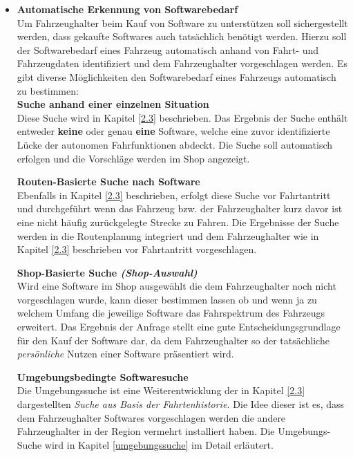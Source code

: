 \begin{itemize}
	\item[] \hspace{-0.6cm} \textbf{Automatische Erkennung von Softwarebedarf}\\
	Um Fahrzeughalter beim Kauf von Software zu unterstützen soll sichergestellt werden, dass gekaufte Softwares auch tatsächlich benötigt werden. Hierzu soll der Softwarebedarf eines Fahrzeug automatisch anhand von Fahrt- und Fahrzeugdaten identifiziert und dem Fahrzeughalter vorgeschlagen werden. Es gibt diverse Möglichkeiten den Softwarebedarf eines Fahrzeugs automatisch zu bestimmen:\\	
	\subitem \textbf{Suche anhand einer einzelnen Situation} \\
		Diese Suche wird in Kapitel \ref{2.3} beschrieben. Das Ergebnis der Suche enthält entweder \textbf{keine} oder genau \textbf{eine} Software, welche eine zuvor identifizierte Lücke der autonomen Fahrfunktionen abdeckt. Die Suche soll automatisch erfolgen und die Vorschläge werden im Shop angezeigt.
		
	\subitem \textbf{Routen-Basierte Suche nach Software}\\
		Ebenfalls in Kapitel \ref{2.3} beschrieben, erfolgt diese Suche vor Fahrtantritt und durchgeführt wenn das Fahrzeug bzw. der Fahrzeughalter kurz davor ist eine nicht häufig zurückgelegte Strecke zu Fahren. Die Ergebnisse der Suche werden in die Routenplanung integriert und dem Fahrzeughalter wie in Kapitel \ref{2.3} beschrieben vor Fahrtantritt vorgeschlagen.
		
	\subitem \textbf{Shop-Basierte Suche \textit{(Shop-Auswahl)}}\\
		Wird eine Software im Shop ausgewählt die dem Fahrzeughalter noch nicht vorgeschlagen wurde, kann dieser bestimmen lassen ob und wenn ja zu welchem Umfang die jeweilige Software das Fahrspektrum des Fahrzeugs erweitert. Das Ergebnis der Anfrage stellt eine gute Entscheidungsgrundlage für den Kauf der Software dar, da dem Fahrzeughalter so der tatsächliche \textit{persönliche} Nutzen einer Software präsentiert wird.
		
	\subitem \textbf{Umgebungsbedingte Softwaresuche}\\
		Die Umgebungssuche ist eine Weiterentwicklung der in Kapitel \ref{2.3} dargestellten \textit{Suche aus Basis der Fahrtenhistorie.} Die Idee dieser ist es, dass dem Fahrzeughalter Softwares vorgeschlagen werden die andere Fahrzeughalter in der Region vermehrt installiert haben. Die Umgebungs-Suche wird in Kapitel \ref{umgebungssuche} im Detail erläutert.
	

\end{itemize}
